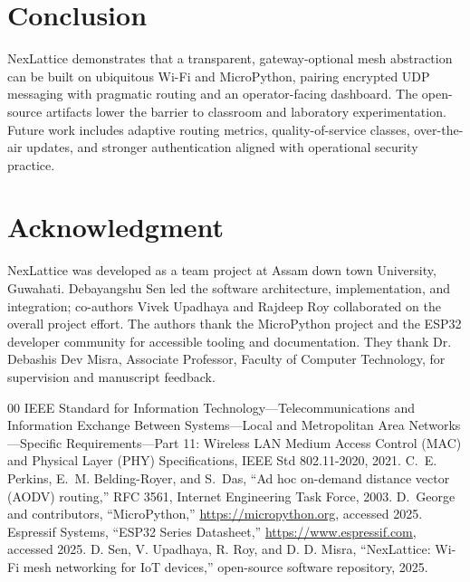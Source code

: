 \documentclass[conference]{IEEEtran}
\begin{document}
\section{Conclusion}
NexLattice demonstrates that a transparent, gateway-optional mesh abstraction can be built on ubiquitous Wi-Fi and MicroPython, pairing encrypted UDP messaging with pragmatic routing and an operator-facing dashboard. The open-source artifacts lower the barrier to classroom and laboratory experimentation. Future work includes adaptive routing metrics, quality-of-service classes, over-the-air updates, and stronger authentication aligned with operational security practice.

\section*{Acknowledgment}
NexLattice was developed as a team project at Assam down town University, Guwahati. Debayangshu Sen led the software architecture, implementation, and integration; co-authors Vivek Upadhaya and Rajdeep Roy collaborated on the overall project effort. The authors thank the MicroPython project and the ESP32 developer community for accessible tooling and documentation. They thank Dr. Debashis Dev Misra, Associate Professor, Faculty of Computer Technology, for supervision and manuscript feedback.

\begin{thebibliography}{00}
 IEEE Standard for Information Technology---Telecommunications and Information Exchange Between Systems---Local and Metropolitan Area Networks---Specific Requirements---Part 11: Wireless LAN Medium Access Control (MAC) and Physical Layer (PHY) Specifications, IEEE Std 802.11-2020, 2021.
 C.~E. Perkins, E.~M. Belding-Royer, and S.~Das, ``Ad hoc on-demand distance vector (AODV) routing,'' RFC 3561, Internet Engineering Task Force, 2003.
 D.~George and contributors, ``MicroPython,'' \url{https://micropython.org}, accessed 2025.
 Espressif Systems, ``ESP32 Series Datasheet,'' \url{https://www.espressif.com}, accessed 2025.
 D. Sen, V. Upadhaya, R. Roy, and D. D. Misra, ``NexLattice: Wi-Fi mesh networking for IoT devices,'' open-source software repository, 2025.
\end{thebibliography}
\end{document}

